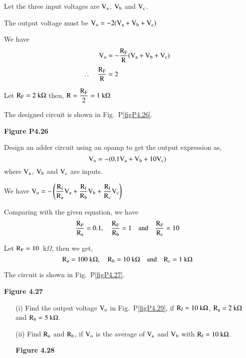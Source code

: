 \begin{solution}
Let the three input voltages are $\textrm{V}_{\textrm{a}}$, $\textrm{V}_{\textrm{b}}$ and $\textrm{V}_{\textrm{c}}$.

\medskip
The output voltage must be $\textrm{V}_{\textrm{o}}=-2(\textrm{V}_{\textrm{a}}+\textrm{V}_{\textrm{b}}+\textrm{V}_{\textrm{c}})$

\medskip
We have 
\begin{align*}
\textrm{V}_{\textrm{o}} &=-\frac{\textrm{R}_{\textrm{F}}}{\textrm{R}}(\textrm{V}_{\textrm{a}}+\textrm{V}_{\textrm{b}}+\textrm{V}_{\textrm{c}})\\[3pt]
\therefore\quad \frac{\textrm{R}_{\textrm{F}}}{\textrm{R}} &= 2
\end{align*}

Let $\textrm{R}_{\textrm{F}}=2~\textrm{k}\Omega$ then, $\textrm{R}=\dfrac{\textrm{R}_{\textrm{F}}}{2}=1~\textrm{k}\Omega$

The designed circuit is shown in Fig.~P\ref{figP4.26}.
\begin{center}
{\bf Figure P4.26}
\end{center}
\end{solution}

\begin{problem}\label{prob4.28}
Design an adder circuit using an opamp to get the output expression as,
$$
\textrm{V}_{\textrm{o}}=-(0.1\textrm{V}_{\textrm{a}}+\textrm{V}_{\textrm{b}}+10\textrm{V}_{\textrm{c}})
$$
where $\textrm{V}_{\textrm{a}}$, $\textrm{V}_{\textrm{b}}$ and $\textrm{V}_{\textrm{c}}$ are inputs.
\end{problem}

\begin{solution}
We have $\textrm{V}_{\textrm{o}}=-\left(\dfrac{\textrm{R}_{\textrm{f}}}{\textrm{R}_{\textrm{a}}}\textrm{V}_{\textrm{a}}+\dfrac{\textrm{R}_{\textrm{f}}}{\textrm{R}_{\textrm{b}}}\textrm{V}_{\textrm{b}}+\dfrac{\textrm{R}_{\textrm{f}}}{\textrm{R}_{\textrm{c}}}\textrm{V}_{\textrm{c}}\right)$

\smallskip
Comparing with the given equation, we have
$$
\dfrac{\textrm{R}_{\textrm{F}}}{\textrm{R}_{\textrm{a}}}=0.1,\quad \dfrac{\textrm{R}_{\textrm{F}}}{\textrm{R}_{\textrm{b}}}=1\quad\text{and}\quad \dfrac{\textrm{R}_{\textrm{F}}}{\textrm{R}_{\textrm{c}}}=10
$$

Let $\textrm{R}_{\textrm{F}}=10$~k$\Omega$, then we get,
$$
\textrm{R}_{\textrm{a}}=100~\textrm{k}\Omega,\quad \textrm{R}_{\textrm{b}}=10~\textrm{k}\Omega\quad\text{and}\quad \textrm{R}_{\textrm{c}}=1~\textrm{k}\Omega
$$

The circuit is shown in Fig.~P\ref{figP4.27}.
\begin{center}
{\bf Figure 4.27}
\end{center}
\end{solution}

\begin{problem}\label{prob4.29}
\begin{itemize}
\item[(i)] Find the output voltage $\textrm{V}_{\textrm{o}}$ in Fig.~P\ref{figP4.29}, if $\textrm{R}_{\textrm{f}}=10~\textrm{k}\Omega$, $\textrm{R}_{\textrm{a}}=2~\textrm{k}\Omega$ and $\textrm{R}_{\textrm{b}}=5~\textrm{k}\Omega$.

\item[(ii)] Find $\textrm{R}_{\textrm{a}}$ and $\textrm{R}_{\textrm{b}}$, if $\textrm{V}_{\textrm{o}}$ is the average of $\textrm{V}_{\textrm{a}}$ and $\textrm{V}_{\textrm{b}}$ with $\textrm{R}_{\textrm{f}}=10~\textrm{k}\Omega$.
\begin{center}
{\bf Figure 4.28}
\end{center}
\end{itemize}
\end{problem}

